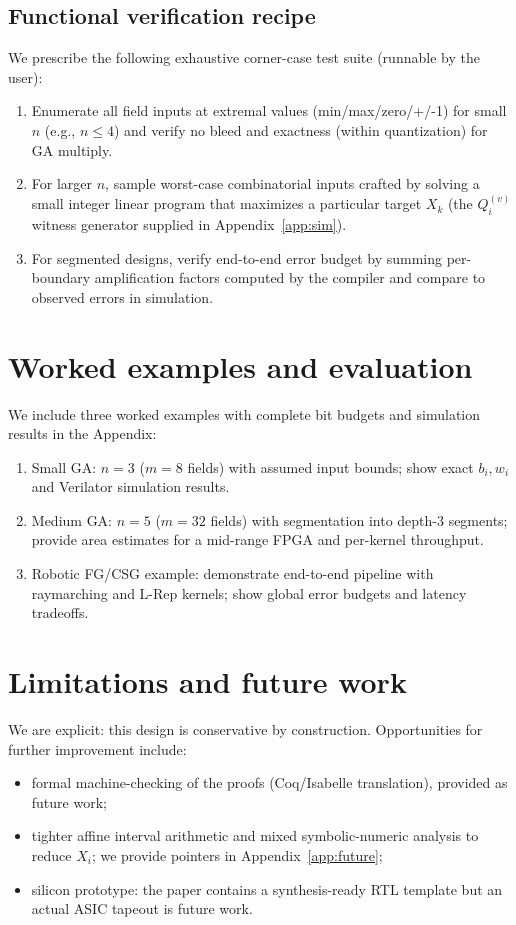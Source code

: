 \documentclass[11pt]{article}
\theoremstyle{definition}
\theoremstyle{plain}
\begin{document}
\subsection{Functional verification recipe}
We prescribe the following exhaustive corner-case test suite (runnable by the user):
\begin{enumerate}
  \item Enumerate all field inputs at extremal values (min/max/zero/+/-1) for small $n$ (e.g., $n\le 4$) and verify no bleed and exactness (within quantization) for GA multiply.
  \item For larger $n$, sample worst-case combinatorial inputs crafted by solving a small integer linear program that maximizes a particular target $X_k$ (the $Q^{(v)}_i$ witness generator supplied in Appendix~\ref{app:sim}).
  \item For segmented designs, verify end-to-end error budget by summing per-boundary amplification factors computed by the compiler and compare to observed errors in simulation.
\end{enumerate}

\section{Worked examples and evaluation}
We include three worked examples with complete bit budgets and simulation results in the Appendix:
\begin{enumerate}
  \item Small GA: $n=3$ ($m=8$ fields) with assumed input bounds; show exact $b_i,w_i$ and Verilator simulation results.
  \item Medium GA: $n=5$ ($m=32$ fields) with segmentation into depth-3 segments; provide area estimates for a mid-range FPGA and per-kernel throughput.
  \item Robotic FG/CSG example: demonstrate end-to-end pipeline with raymarching and L-Rep kernels; show global error budgets and latency tradeoffs.
\end{enumerate}

\section{Limitations and future work}
We are explicit: this design is conservative by construction.  Opportunities for further improvement include:
\begin{itemize}
  \item formal machine-checking of the proofs (Coq/Isabelle translation), provided as future work;
  \item tighter affine interval arithmetic and mixed symbolic-numeric analysis to reduce $X_i$; we provide pointers in Appendix~\ref{app:future};
  \item silicon prototype: the paper contains a synthesis-ready RTL template but an actual ASIC tapeout is future work.
\end{itemize}
\end{document}
